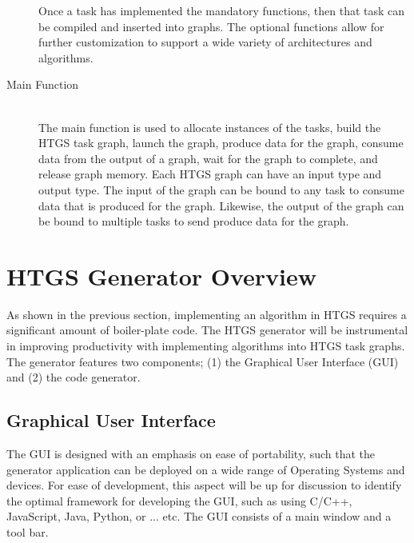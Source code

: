 \documentclass[]{article}
\begin{document}
\begin{description}
	Once a task has implemented the mandatory functions, then that task can be compiled and inserted into graphs. The optional functions allow for further customization to support a wide variety of architectures and algorithms.

\item[Main Function] \hfill \\
	The main function is used to allocate instances of the tasks, build the HTGS task graph, launch the graph, produce data for the graph, consume data from the output of a graph, wait for the graph to complete, and release graph memory. Each HTGS graph can have an input type and output type. The input of the graph can be bound to any task to consume data that is produced for the graph. Likewise, the output of the graph can be bound to multiple tasks to send produce data for the graph.
	
\end{description}


\section{HTGS Generator Overview}

As shown in the previous section, implementing an algorithm in HTGS requires a significant amount of boiler-plate code. The HTGS generator will be instrumental in improving productivity with implementing algorithms into HTGS task graphs. The generator features two components; (1) the Graphical User Interface (GUI) and (2) the code generator.


\subsection{Graphical User Interface}

The GUI is designed with an emphasis on ease of portability, such that the generator application can be deployed on a wide range of Operating Systems and devices. For ease of development, this aspect will be up for discussion to identify the optimal framework for developing the GUI, such as using C/C++, JavaScript, Java, Python, or ... etc. The GUI consists of a main window and a tool bar. 
\end{document}
